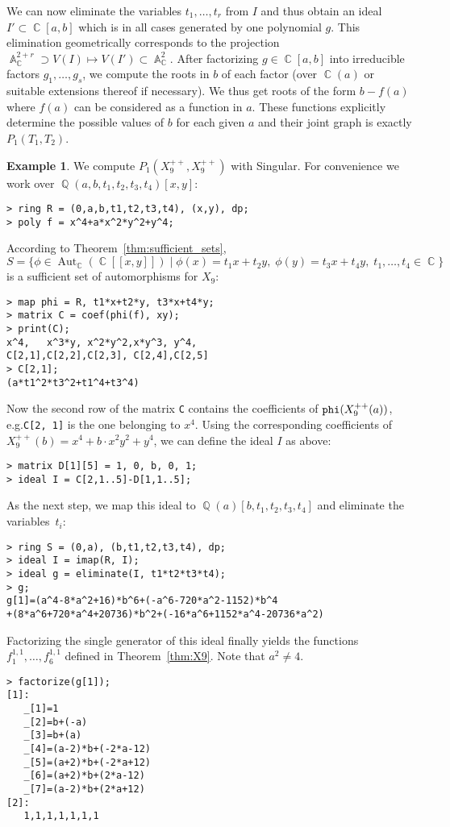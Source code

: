\documentclass[noend]{amsproc}
\theoremstyle{definition}
\newtheorem{example}[theorem]{Example}
\DeclareMathOperator{\Q}{\mathbb{Q}}
\DeclareMathOperator{\C}{\mathbb{C}}
\DeclareMathOperator{\A}{\mathbb{A}}
\DeclareMathOperator{\Aut}{Aut}
\begin{document}
We can now eliminate the variables $t_1, \ldots, t_r$ from $I$ and thus obtain
an ideal $I' \subset \C[a,b]$ which is in all cases generated by one polynomial
$g$. This elimination geometrically corresponds to the projection
$\A_{\C}^{2+r} \supset V(I) \mapsto V(I') \subset \A_{\C}^2$. After factorizing
$g \in \C[a,b]$ into irreducible factors $g_1, \ldots, g_s$, we compute the
roots in $b$ of each factor (over $\C(a)$ or suitable extensions thereof if
necessary). We thus get roots of the form $b-f(a)$ where $f(a)$ can be
considered as a function in $a$. These functions explicitly determine the
possible values of $b$ for each given $a$ and their joint graph is exactly
$P_1(T_1, T_2)$.

\begin{example}\label{ex:P1}
We compute $P_1(X_9^{++}, X_9^{++})$ with Singular. For convenience we work
over $\Q(a,b,t_1,t_2,t_3,t_4)[x,y]$:
\begin{verbatim}
> ring R = (0,a,b,t1,t2,t3,t4), (x,y), dp;
> poly f = x^4+a*x^2*y^2+y^4;
\end{verbatim}
According to Theorem~\ref{thm:sufficient_sets},
\[
S = \{ \phi \in \Aut_{\C}(\C[[x,y]])
\mid \phi(x) = t_1 x + t_2 y,\; \phi(y) = t_3 x + t_4 y,\;
t_1, \ldots, t_4 \in \C \}
\]
is a sufficient set of automorphisms for $X_9$:
\begin{verbatim}
> map phi = R, t1*x+t2*y, t3*x+t4*y;
> matrix C = coef(phi(f), xy);
> print(C);
x^4,   x^3*y, x^2*y^2,x*y^3, y^4,  
C[2,1],C[2,2],C[2,3], C[2,4],C[2,5]
> C[2,1];
(a*t1^2*t3^2+t1^4+t3^4)
\end{verbatim}
Now the second row of the matrix \verb+C+ contains the coefficients of
$\verb+phi+(X_9^{++}(a))$, e.g.\@ \verb+C[2, 1]+ is the one belonging to $x^4$.
Using the corresponding coefficients of
$X_9^{++}(b) = x^4 + b \cdot x^2 y^2 + y^4$, we can define the ideal $I$ as
above:
\begin{verbatim}
> matrix D[1][5] = 1, 0, b, 0, 1;
> ideal I = C[2,1..5]-D[1,1..5];
\end{verbatim}
As the next step, we map this ideal to $\Q(a)[b,t_1,t_2,t_3,t_4]$ and eliminate
the variables~$t_i$:
\begin{verbatim}
> ring S = (0,a), (b,t1,t2,t3,t4), dp;
> ideal I = imap(R, I);
> ideal g = eliminate(I, t1*t2*t3*t4);
> g;
g[1]=(a^4-8*a^2+16)*b^6+(-a^6-720*a^2-1152)*b^4
+(8*a^6+720*a^4+20736)*b^2+(-16*a^6+1152*a^4-20736*a^2)
\end{verbatim}
Factorizing the single generator of this ideal finally yields the functions
$f_1^{1,1}, \ldots, f_6^{1,1}$ defined in Theorem~\ref{thm:X9}. Note that
$a^2 \neq 4$.
\begin{verbatim}
> factorize(g[1]);
[1]:
   _[1]=1
   _[2]=b+(-a)
   _[3]=b+(a)
   _[4]=(a-2)*b+(-2*a-12)
   _[5]=(a+2)*b+(-2*a+12)
   _[6]=(a+2)*b+(2*a-12)
   _[7]=(a-2)*b+(2*a+12)
[2]:
   1,1,1,1,1,1,1
\end{verbatim}
\end{example}
\end{document}
